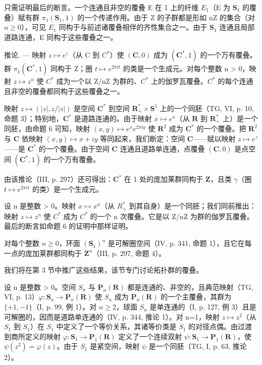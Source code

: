 只需证明最后的断言。一个连通且非空的覆叠 E 在 1 上的纤维 \(E_{1}\)（E 为 \(\mathbf{S}_{1}\) 的覆叠）赋有群 \(\pi_{1}(\mathbf{S}_{1},1)\) 的一个传递作用。由于 Z 的子群都是形如 nZ 的集合（对 \(n \geqslant 0\)），可见 \(E_{1}\) 同构于与前述诸覆叠相伴的齐性集合之一。由于 \(\mathbf{S}_{1}\) 连通且局部道路连通，E 同构于这些覆叠之一。

推论. --- 映射 \(z \mapsto e^{z}\)（从 C 到 \(C^{*}\)）使 \((\mathbf{C},0)\) 成为 \((\mathbf{C}^{*},1)\) 的一个万有覆叠。群 \(\pi_{1}(\mathbf{C}^{*},1)\) 同构于 Z；圈 \(t \mapsto e^{2\pi it}\) 的类是一个生成元。对每个整数 n \textgreater{} 0，映射 \(z \mapsto z^{n}\) 使 \(C^{*}\) 成为一个以 Z/nZ 为群的、\(C^{*}\) 上的伽罗瓦覆叠。\(C^{*}\) 的每个连通且非空的覆叠都同构于这些覆叠之一。

映射 \(z \mapsto (|z|, z/|z|)\) 是空间 \(\mathbf{C}^*\) 到空间 \(\mathbf{R}_+^* \times \mathbf{S}^1\) 上的一个同胚（TG, VI, p. 10, 命题 3）；特别地，\(\mathbf{C}^*\) 是道路连通的。由于映射 \(x \mapsto e^x\)（从 \(\mathbf{R}\) 到 \(\mathbf{R}_+^*\) 上）是一个同胚，由命题 6 可知，映射 \((x, y) \mapsto e^x e^{2\pi iy}\) 使 \(\mathbf{R}^2\) 成为 \(\mathbf{C}^*\) 的一个覆叠。把 \(\mathbf{R}^2\) 与 \(\mathbf{C}\) 依映射 \((x, y) \mapsto x + iy\) 等同起来，我们断定：空间 \(\mathbf{C}\)——赋以映射 \(z \mapsto e^z\)——是 \(\mathbf{C}^*\) 的一个覆叠。由于空间 \(\mathbf{C}\) 连通且道路单连通，点覆叠 \((\mathbf{C}, 0)\) 是点空间 \((\mathbf{C}^*, 1)\) 的一个万有覆叠。

由该推论（III, p. 297）还可得出：\(\mathbf{C}^*\) 在 1 处的庞加莱群同构于 \(\mathbf{Z}\)，且类 \(\gamma\)（圈 \(t \mapsto e^{2\pi it}\) 的类）是一个生成元。

  设 n 是整数 \textgreater{} 0。映射 \(x \mapsto x^{n}\)（从 \(R_{+}^{*}\) 到其自身）是一个同胚；我们同前推出：映射 \(z \mapsto z^{n}\) 使 \(C^{*}\) 成为 \(C^{*}\) 的一个 n 次覆叠。它是以 Z/nZ 为群的伽罗瓦覆叠。最后的断言如命题 6 的证明中那样证明。

对每个整数 \(n \geqslant 0\)，环面 \((\mathbf{S}_{1})^{n}\) 是可解圈空间（IV, p. 341, 命题 1），且它在每一点的庞加莱群都同构于 \(\mathbf{Z}^{n}\)（III, p. 297, 命题 4）。

我们将在第 3 节中推广这些结果，该节专门讨论拓扑群的覆叠。


设 n 是整数 \textgreater{} 0。空间 \(S_{n}\) 与 \(\mathbf{P}_{n}(\mathbf{R})\) 都是连通的、非空的，且典范映射（TG, VI, p. 13）\(\varphi\colon\mathbf{S}_{n}\to\mathbf{P}_{n}(\mathbf{R})\) 使 \(S_{n}\) 成为 \(\mathbf{P}_{n}(\mathbf{R})\) 的一个主覆叠，其群为 \(\{+1,-1\}\)（I, p. 99, 例 1）。对 \(n\geqslant2\)，球面 \(S_{n}\) 是单连通的（I, p. 127, 例 3）且是可解圈的，因而是道路单连通的（IV, p. 344, 推论 1）。对 n=1，映射 \(z\mapsto z^{2}\)（从 \(S_{1}\) 到 \(S_{1}\)）在 \(S_{1}\) 中定义了一个等价关系，其诸等价类是 \(S_{1}\) 的对径点偶。由过渡到商所定义的映射 \(\varphi\colon\mathbf{S}_{1}\to\mathbf{P}_{1}(\mathbf{R})\) 定义了一个连续双射 \(\psi\colon\mathbf{S}_{1}\to\mathbf{P}_{1}(\mathbf{R})\)，使 \(\psi(z^{2})=\varphi(z)\)。由于 \(S_{1}\) 是紧空间，映射 \(\psi\) 是一个同胚（TG, I, p. 63, 推论 2）。

